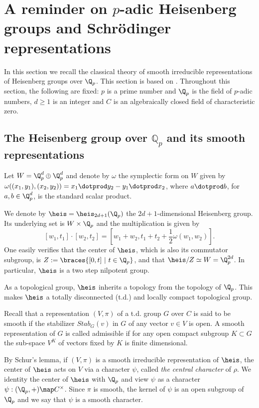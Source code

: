 \section{A reminder on $p$-adic Heisenberg groups and Schrödinger representations}
In this section we recall the classical theory of smooth irreducible representations of Heisenberg groups over $\Q_p$.
This section is based on \cite{kudla_notes,van1978smooth}.
Throughout this section, the following are fixed: $p$ is a prime number and $\Q_p$ is the field of $p$-adic numbers, $d\geq 1$ is an integer and $C$ is an algebraically closed field of characteristic zero.

\subsection{The Heisenberg group over $\mathbb{Q}_p$ and its smooth representations}
Let $W=\Q_p^d\oplus \Q_p^d$ and denote by $\omega$ the symplectic form on $W$ given by $\omega((x_1,y_1),(x_2,y_2))=x_1\dotprod y_2-y_1\dotprod x_2$, where $a\dotprod b$, for $a,b\in\Q_p^d$, is the standard scalar product.

We denote by $\heis=\heis_{2d+1}(\Q_p)$ the $2d+1$-dimensional Heisenberg group.
Its underlying set is $W\times \Q_p$ and the multiplication is given by 
\[[w_1,t_1]\cdot [w_2,t_2]=[w_1+w_2,t_1+t_2+\frac{1}{2}\omega(w_1,w_2)].\]
One easily verifies that the center of $\heis$, which is also its commutator subgroup, is $Z:=\braces{[0,t]\ |\ t\in \Q_p}$, and that $\heis/Z\simeq W=\Q_p^{2d}$.
In particular, $\heis$ is a two step nilpotent group.

As a topological group, $\heis$ inherits a topology from the topology of $\Q_p$.
This makes $\heis$ a totally disconnected (t.d.) and locally compact topological group.

Recall that a representation $(V,\pi)$ of a t.d. group $G$ over $C$ is said to be smooth if the stabilizer $Stab_G(v)$ in $G$ of any vector $v\in V$ is open.
A smooth representation of $G$ is called admissible if for any open compact subgroup $K\subset G$ the sub-space $V^K$ of vectors fixed by $K$ is finite dimensional.

By Schur's lemma, if $(V,\pi)$ is a smooth irreducible representation of $\heis$, the center of $\heis$ acts on $V$ via a character $\psi$, called \textit{the central character} of $\rho$.
We identity the center of $\heis$ with $\Q_p$ and view $\psi$ as a character $\psi:(\Q_p,+)\map C^\times$.
Since $\pi$ is smooth, the kernel of $\psi$ is an open subgroup of $\Q_p$ and we say that $\psi$ is a smooth character.


